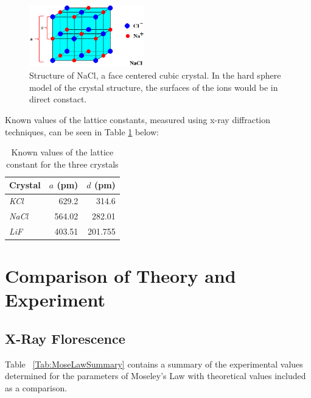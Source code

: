 \documentclass[%
 reprint,
 amsmath,amssymb,
 aps,
 pra,
]{revtex4-1}
\begin{document}
\begin{figure}[H]
	\centering
	\includegraphics[width=5cm]{nacl_lattice.png}
	\caption{Structure of NaCl, a face centered cubic crystal. In the hard sphere model of the crystal structure, the surfaces of the ions would be in direct constact.}
	\label{fig:lattice_nacl}
\end{figure}

Known values\cite{lattice, lattice2, lattice3} of the lattice constants, measured using x-ray diffraction techniques, can be seen in Table \ref{table:known_d} below:

\begin{table}[htbp]
	\begin{center}
	\begin{tabular}{|l|r|r|}
		\hline
		\textbf{Crystal} & \multicolumn{1}{l|}{\textbf{$a$ (pm)}} & \multicolumn{1}{l|}{\textbf{$d$ (pm)}} \\ \hline
		\textit{KCl} & 629.2 & 314.6 \\ \hline
		\textit{NaCl} & 564.02 & 282.01 \\ \hline
		\textit{LiF} & 403.51 & 201.755 \\ \hline
	\end{tabular}
	\end{center}
	\caption{Known values of the lattice constant for the three crystals}
	\label{table:known_d}
\end{table}


\section{Comparison of Theory and Experiment}

\subsection{X-Ray Florescence}

Table ~\ref{Tab:MoseLawSummary} contains a summary of the experimental values determined for the parameters of Moseley's Law with theoretical values included as a comparison.
\end{document}
